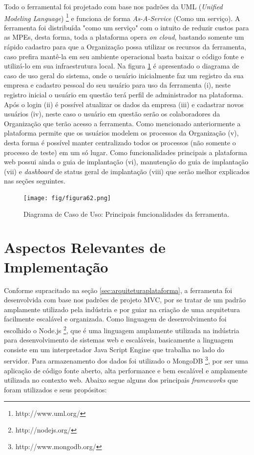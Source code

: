 Todo o ferramental foi projetado com base nos padrões da UML (\textit{Unified Modeling Language}) \footnote{http://www.uml.org/} e funciona de forma \textit{As-A-Service} (Como um serviço). A ferramenta foi distribuída "como um serviço" com o intuito de reduzir custos para as MPEs, desta forma, toda a plataforma opera \textit{on cloud}, bastando somente um rápido cadastro para que a Organização possa utilizar os recursos da ferramenta, caso prefira mantê-la em seu ambiente operacional basta baixar o código fonte e utilizá-lo em sua infraestrutura local. Na figura \ref{fig:fig62} é apresentado o diagrama de caso de uso geral do sistema, onde o usuário inicialmente faz um registro da sua empresa e cadastro pessoal do seu usuário para uso da ferramenta (i), neste registro inicial o usuário em questão terá perfil de administrador na plataforma. Após o login (ii) é possível atualizar os dados da empresa (iii) e cadastrar novos usuários (iv), neste caso o usuário em questão serão os colaboradores da Organização que terão acesso a ferramenta. Como mencionado anteriormente a plataforma permite que os usuários modelem os processos da Organização (v), desta forma é possível manter centralizado todos os processos (não somente o processo de teste) em um só lugar. Como funcionalidades principais a plataforma web possui ainda o guia de implantação (vi), manutenção do guia de implantação (vii) e \textit{dashboard} de status geral de implantação (viii) que serão melhor explicados nas seções seguintes.

\begin{figure}[H]
\centering
\texttt{[image: fig/figura62.png]}
\caption{Diagrama de Caso de Uso: Principais funcionalidades da ferramenta.}
\label{fig:fig62}
\end{figure}

\section{Aspectos Relevantes de Implementação}
\label{sec:implementacaoplataforma}

Conforme supracitado na seção \ref{sec:arquiteturaplataforma}, a ferramenta foi desenvolvida com base nos padrões de projeto MVC, por se tratar de um padrão amplamente utilizado pela indústria e por guiar na criação de uma arquitetura facilmente escalável e organizada. Como linguagem de desenvolvimento foi escolhido o Node.js \footnote{http://nodejs.org/}, que é uma linguagem amplamente utilizada na indústria para desenvolvimento de sistemas web e escaláveis, basicamente a linguagem consiste em um interpretador Java Script Engine que trabalha no lado do servidor. Para armazenamento dos dados foi utilizado o MongoDB \footnote{http://www.mongodb.org/}, por ser uma aplicação de código fonte aberto, alta performance e bem escalável e amplamente utilizada no contexto web. Abaixo segue alguns dos principais \textit{frameworks} que foram utilizados e seus propósitos:

